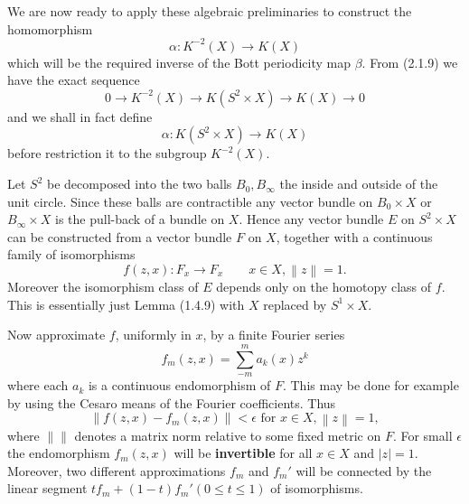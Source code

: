 \documentclass[leqno]{book}
\numberwithin{equation}{section}
\theoremstyle{definition}
\renewcommand{\emph}{\textbf}
\begin{document}
            We are now ready to apply these algebraic preliminaries to construct the homomorphism
            \begin{equation*}
              \alpha:K^{-2}(X)\to K(X)
            \end{equation*}
            which will be the required inverse of the Bott periodicity map $\beta$. From (2.1.9) we have the exact sequence
            \begin{equation*}
              0\to K^{-2}(X)\to K(S^{2}\times X)\to K(X)\to 0
            \end{equation*} 
            and we shall in fact define
            \begin{equation*}
              \alpha:K(S^{2}\times X)\to K(X)
            \end{equation*}
            before restriction it to the subgroup $K^{-2}(X)$.

            Let $S^{2}$ be decomposed into the two balls $B_0,B_{\infty}$ the inside and outside of the unit circle. Since these balls are contractible any vector bundle on $B_0\times X$ or $B_{\infty}\times X$ is the pull-back of a bundle on $X$. Hence any vector bundle $E$ on $S^{2}\times X$ can be constructed from a vector bundle $F$ on $X$, together with a continuous family of isomorphisms 
            \begin{equation*}
              f(z,x):F_{x}\to F_{x}\qquad x\in X, \left\| z \right\|=1.
            \end{equation*}
            Moreover the isomorphism class of $E$ depends only on the homotopy class of $f$. This is essentially just Lemma (1.4.9) with $X$ replaced by $S^{1}\times X$.

            Now approximate $f$, uniformly in $x$, by a finite Fourier series 
            \begin{equation*}
              f_{m}(z,x)=\sum_{-m}^{m}a_{k}(x)z^{k}
            \end{equation*}
            where each $a_{k}$ is a continuous endomorphism of $F$. This may be done for example by using the Cesaro means of the Fourier coefficients. Thus 
            \begin{equation*}
              \left\| f(z,x)-f_{m}(z,x) \right\|<\epsilon \text{ for } x\in X, \left\| z \right\|=1,
            \end{equation*}
            where $\left\|  \right\|$ denotes a matrix norm relative to some fixed metric on $F$. For small $\epsilon$ the endomorphism $f_{m}(z,x)$ will be \emph{invertible} for all $x\in X$ and $|z|=1$. Moreover, two different approximations $f_{m}$ and $f_{m}'$ will be connected by the linear segment $tf_{m}+(1-t)f_{m}' (0\le t\le 1)$ of isomorphisms.
\end{document}
